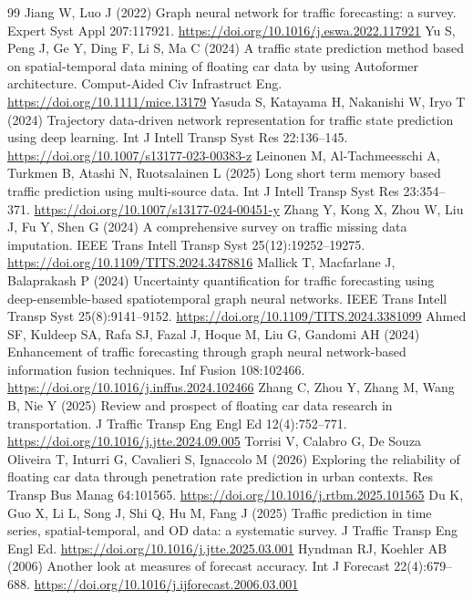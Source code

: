 \documentclass[smallcondensed]{svjour3}
\begin{document}
\begin{thebibliography}{99}
 Jiang W, Luo J (2022) Graph neural network for traffic forecasting: a survey. Expert Syst Appl 207:117921. \url{https://doi.org/10.1016/j.eswa.2022.117921}
 Yu S, Peng J, Ge Y, Ding F, Li S, Ma C (2024) A traffic state prediction method based on spatial-temporal data mining of floating car data by using Autoformer architecture. Comput-Aided Civ Infrastruct Eng. \url{https://doi.org/10.1111/mice.13179}
 Yasuda S, Katayama H, Nakanishi W, Iryo T (2024) Trajectory data-driven network representation for traffic state prediction using deep learning. Int J Intell Transp Syst Res 22:136--145. \url{https://doi.org/10.1007/s13177-023-00383-z}
 Leinonen M, Al-Tachmeesschi A, Turkmen B, Atashi N, Ruotsalainen L (2025) Long short term memory based traffic prediction using multi-source data. Int J Intell Transp Syst Res 23:354--371. \url{https://doi.org/10.1007/s13177-024-00451-y}
 Zhang Y, Kong X, Zhou W, Liu J, Fu Y, Shen G (2024) A comprehensive survey on traffic missing data imputation. IEEE Trans Intell Transp Syst 25(12):19252--19275. \url{https://doi.org/10.1109/TITS.2024.3478816}
 Mallick T, Macfarlane J, Balaprakash P (2024) Uncertainty quantification for traffic forecasting using deep-ensemble-based spatiotemporal graph neural networks. IEEE Trans Intell Transp Syst 25(8):9141--9152. \url{https://doi.org/10.1109/TITS.2024.3381099}
 Ahmed SF, Kuldeep SA, Rafa SJ, Fazal J, Hoque M, Liu G, Gandomi AH (2024) Enhancement of traffic forecasting through graph neural network-based information fusion techniques. Inf Fusion 108:102466. \url{https://doi.org/10.1016/j.inffus.2024.102466}
 Zhang C, Zhou Y, Zhang M, Wang B, Nie Y (2025) Review and prospect of floating car data research in transportation. J Traffic Transp Eng Engl Ed 12(4):752--771. \url{https://doi.org/10.1016/j.jtte.2024.09.005}
 Torrisi V, Calabro G, De Souza Oliveira T, Inturri G, Cavalieri S, Ignaccolo M (2026) Exploring the reliability of floating car data through penetration rate prediction in urban contexts. Res Transp Bus Manag 64:101565. \url{https://doi.org/10.1016/j.rtbm.2025.101565}
 Du K, Guo X, Li L, Song J, Shi Q, Hu M, Fang J (2025) Traffic prediction in time series, spatial-temporal, and OD data: a systematic survey. J Traffic Transp Eng Engl Ed. \url{https://doi.org/10.1016/j.jtte.2025.03.001}
 Hyndman RJ, Koehler AB (2006) Another look at measures of forecast accuracy. Int J Forecast 22(4):679--688. \url{https://doi.org/10.1016/j.ijforecast.2006.03.001}

\end{thebibliography}
\end{document}
